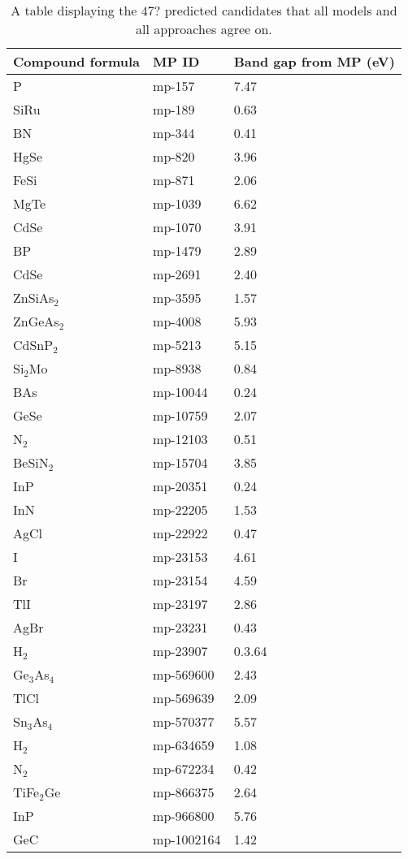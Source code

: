 \begin{center}
\begin{longtable}{M{3.5cm} M{6.5cm} M{2.0cm}}
\caption{A table displaying the $47$? predicted candidates that all models and all approaches agree on.}
\label{tab:03-probability-candidates}  
\hline
Compound formula & MP ID & Band gap from MP (eV) \\
\hline
  P & mp-157 & 7.47\\
  SiRu & mp-189 & 0.63\\
  BN & mp-344 & 0.41\\
  HgSe & mp-820 & 3.96\\
  FeSi & mp-871 & 2.06\\
  MgTe & mp-1039 & 6.62\\
  CdSe & mp-1070 & 3.91\\
  BP & mp-1479 & 2.89\\
  CdSe & mp-2691 & 2.40\\
  ZnSiAs$_2$ & mp-3595 & 1.57\\
  ZnGeAs$_2$ & mp-4008 & 5.93\\
  CdSnP$_2$ & mp-5213 & 5.15\\
  Si$_2$Mo & mp-8938 & 0.84\\
  BAs & mp-10044 & 0.24\\
  GeSe & mp-10759 & 2.07\\
  N$_2$ & mp-12103 & 0.51\\
  BeSiN$_2$ & mp-15704 & 3.85\\
  InP & mp-20351 & 0.24\\
  InN & mp-22205 & 1.53\\
  AgCl & mp-22922 & 0.47\\
  I & mp-23153 & 4.61\\
  Br & mp-23154 & 4.59\\
  TlI & mp-23197 & 2.86\\
  AgBr & mp-23231 & 0.43\\
  H$_2$ & mp-23907 & 0.3.64\\
  Ge$_3$As$_4$ & mp-569600 & 2.43\\
  TlCl & mp-569639 & 2.09\\
  Sn$_3$As$_4$ & mp-570377 & 5.57\\
  H$_2$ & mp-634659 & 1.08\\
  N$_2$ & mp-672234 & 0.42\\
  TiFe$_2$Ge & mp-866375 & 2.64\\
  InP & mp-966800 & 5.76\\
  GeC & mp-1002164 & 1.42\\

\end{longtable}
\end{center}
